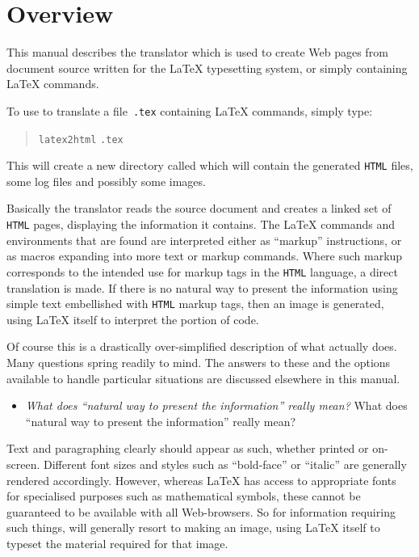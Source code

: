 \section{Overview}
\label{sec:ovw}
\noindent 
This manual describes the \latextohtml{} translator which is
used to create Web pages from document source written for
the \LaTeX{} typesetting system, or simply containing \LaTeX{} commands.

\medskip
\noindent
To use \latextohtml{} to translate a file~\texttt{.tex}
containing \LaTeX{} commands, simply type:
\begin{quote}
\texttt{latex2html} \texttt{.tex} 
\end{quote}
\noindent
This will create a new directory called  which will contain 
the generated \texttt{HTML} files, some log files and possibly some images.

\medskip{}\label{quest0}\smallskip
\noindent
Basically the translator reads the source document and creates a linked
set of \texttt{HTML} pages, displaying the information it contains.
The \LaTeX{} commands and environments that are found are interpreted
either as ``markup'' instructions, or as macros expanding into more text 
or markup commands. 
Where such markup corresponds to the intended use for markup tags
in the \texttt{HTML} language, a direct translation is made.
If there is no natural way to present the information using simple text
embellished with \texttt{HTML} markup tags, then an image is generated, 
using \LaTeX{} itself to interpret the portion of code.

Of course this is a drastically over-simplified description of what
\latextohtml{} actually does. Many questions spring readily to mind.
The answers to these and the options available to handle
particular situations are discussed elsewhere in this manual.

\label{quest1}%
\begin{itemize}
\item \latexhtml
{\emph{What does ``natural way to present the information'' really mean? }}
{{\large What does ``natural way to present the information'' really mean? }}
\end{itemize}
\noindent
Text and paragraphing clearly should appear as such, whether printed
or on-screen. Different font sizes and styles such as ``bold-face''
or ``italic'' are generally rendered accordingly.
However, whereas \LaTeX{} has access to appropriate fonts for specialised
purposes such as mathematical symbols, these cannot be guaranteed to be
available with all Web-browsers. So for information requiring such things,
\latextohtml{} will generally resort to making an image,
using \LaTeX{} itself to typeset the material required for that image. 

